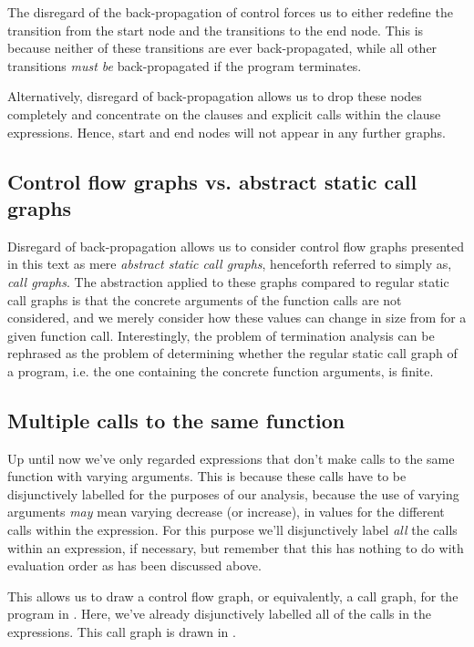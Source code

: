 The disregard of the back-propagation of control forces us to either redefine
the transition from the start node and the transitions to the end node. This is
because neither of these transitions are ever back-propagated, while all other
transitions \emph{must be} back-propagated if the program terminates.

Alternatively, disregard of back-propagation allows us to drop these nodes
completely and concentrate on the clauses and explicit calls within the clause
expressions. Hence, start and end nodes will not appear in any further graphs.

\subsection{Control flow graphs vs. abstract static call graphs}

Disregard of back-propagation allows us to consider control flow graphs
presented in this text as mere \emph{abstract static call graphs}, henceforth
referred to simply as, \emph{call graphs}. The abstraction applied to these
graphs compared to regular static call graphs is that the concrete arguments of
the function calls are not considered, and we merely consider how these values
can change in size from for a given function call. Interestingly, the problem
of termination analysis can be rephrased as the problem of determining whether
the regular static call graph of a program, i.e. the one containing the
concrete function arguments, is finite.

\subsection{Multiple calls to the same function}

Up until now we've only regarded expressions that don't make calls to the same
function with varying arguments. This is because these calls have to be
disjunctively labelled for the purposes of our analysis, because the use of
varying arguments \emph{may} mean varying decrease (or increase), in values for
the different calls within the expression. For this purpose we'll disjunctively
label \emph{all} the calls within an expression, if necessary, but remember
that this has nothing to do with evaluation order as has been discussed above.

This allows us to draw a control flow graph, or equivalently, a call graph,
for the program in . Here, we've already
disjunctively labelled all of the calls in the expressions. This call graph is
drawn in .


